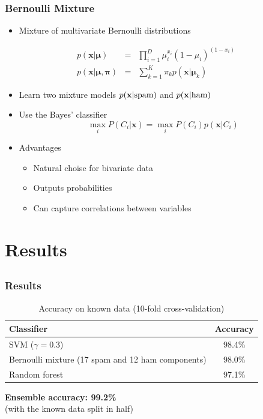 \documentclass{beamer}
\begin{document}
\frame
{
  \frametitle{Bernoulli Mixture}

  \begin{itemize}
    \item Mixture of multivariate Bernoulli distributions
  \end{itemize}
  \begin{eqnarray*}
    p(\mathbf{x}|\boldsymbol\mu) &=& \prod_{i=1}^D \mu_i^{x_i}(1-\mu_i)^{(1-x_i)} \\
    p(\mathbf{x}|\boldsymbol\mu,\boldsymbol\pi) &=& \sum_{k=1}^K \pi_kp(\mathbf{x}|\boldsymbol\mu_k)
  \end{eqnarray*}
  \begin{itemize}
  \item Learn two mixture models $p(\mathbf{x}|\textmd{spam})$ and $p(\mathbf{x}|\textmd{ham})$
  \item Use the Bayes' classifier 
  \begin{equation}
  \max_i P(C_i|\mathbf{x}) = \max_i P(C_i)p(\mathbf{x}|C_i)
  \end{equation}
  \item Advantages
  \begin{itemize}
    \item Natural choise for bivariate data
    \item Outputs probabilities
    \item Can capture correlations between variables
  \end{itemize}
  \end{itemize}

}

\section{Results}
\subsection{}
\frame
{
  \frametitle{Results}

{\scriptsize
\begin{table}
\caption{Accuracy on known data (10-fold cross-validation)}
\begin{tabular}{l|c}
Classifier & Accuracy \\ \hline
SVM ($\gamma = 0.3$) & 98.4\% \\
Bernoulli mixture (17 spam and 12 ham components) & 98.0\% \\
Random forest & 97.1\% \\
\end{tabular}
\end{table}
}
\hspace{1.0cm}

{\bf Ensemble accuracy: 99.2\%} \\
(with the known data split in half)
}
\end{document}
